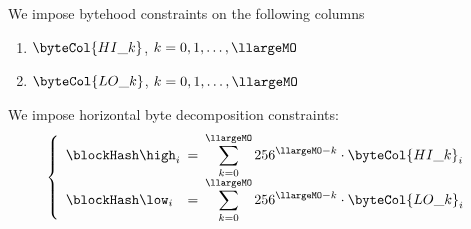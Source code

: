 We impose bytehood constraints on the following columns
\begin{multicols}{2}
\begin{enumerate}
	\item $\byteCol{HI\_k}$, $k = 0, 1, \dots, \llargeMO$
	\item $\byteCol{LO\_k}$, $k = 0, 1, \dots, \llargeMO$
\end{enumerate}
\end{multicols}
\noindent We impose horizontal byte decomposition constraints:
\[
\left\{
\begin{array}{lcl}
	\blockHash\high_{i}
	& \!\!\! = \!\!\! &
	\displaystyle \sum_{k = 0}^{\llargeMO} 256^{\llargeMO - k} \cdot \byteCol{HI\_k}_{i} \\
	\blockHash\low_{i}
	& \!\!\! = \!\!\! &
	\displaystyle \sum_{k = 0}^{\llargeMO} 256^{\llargeMO - k} \cdot \byteCol{LO\_k}_{i} \\
\end{array}
\right.
\]
